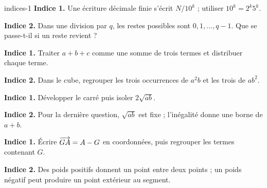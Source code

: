 \clearpage{}\label{indices-debut}
\begin{blocEdition}{indices-1}
\textbf{Indice 1.} Une écriture décimale finie s’écrit $N/10^k$ ; utiliser $10^k=2^k5^k$.\par\smallskip
\textbf{Indice 2.} Dans une division par $q$, les restes possibles sont $0,1,\ldots,q-1$. Que se passe-t-il si un reste revient ?\par
{}
\textbf{Indice 1.} Traiter $a+b+c$ comme une somme de trois termes et distribuer chaque terme.\par\smallskip
\textbf{Indice 2.} Dans le cube, regrouper les trois occurrences de $a^2b$ et les trois de $ab^2$.\par
{}
\textbf{Indice 1.} Développer le carré puis isoler $2\sqrt{ab}$.\par\smallskip
\textbf{Indice 2.} Pour la dernière question, $\sqrt{ab}$ est fixe ; l’inégalité donne une borne de $a+b$.\par
{}
\textbf{Indice 1.} Écrire $\overrightarrow{GA}=A-G$ en coordonnées, puis regrouper les termes contenant $G$.\par\smallskip
\textbf{Indice 2.} Des poids positifs donnent un point entre deux points ; un poids négatif peut produire un point extérieur au segment.\par

\end{blocEdition}
